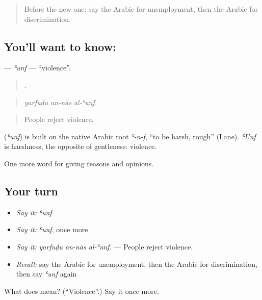 \label{lesson:AR-C381-unf}



\begin{quote}
Before the new one: say the Arabic for unemployment, then the Arabic for discrimination.
\end{quote}

\subsection*{You'll want to know: }
\textbf{} — \emph{ʿunf} — \textquotedblleft{}violence\textquotedblright{}.

\begin{quote}
  .
\end{quote}

\begin{quote}
\emph{yarfuḍu an-nās al-ʿunf.}
\end{quote}

\begin{quote}
People reject violence.
\end{quote}

\begin{cousinweb}
\textbf{} (\emph{ʿunf}) is built on the native Arabic root \emph{ʿ-n-f}, \textquotedblleft{}to be harsh, rough\textquotedblright{} (Lane). \emph{ʿUnf} is harshness, the opposite of gentleness: violence.
\end{cousinweb}

\begin{grammarlens}[title={What you've built}]
One more word for giving reasons and opinions.
\end{grammarlens}

\subsection*{Your turn}
\begin{itemize}
\raggedright
  \item \emph{Say it:} \emph{ʿunf}
  \item \emph{Say it:} \emph{ʿunf}, once more
  \item \emph{Say it:} \emph{yarfuḍu an-nās al-ʿunf.} — People reject violence.
  \item \emph{Recall:} say the Arabic for unemployment, then the Arabic for discrimination, then say \emph{ʿunf} again
\end{itemize}

\begin{tcolorbox}[breakable,colback=teal!4,colframe=teal!35!black,title={Before you move on}]
What does  mean? (\textquotedblleft{}Violence\textquotedblright{}.) Say it once more.
\end{tcolorbox}
